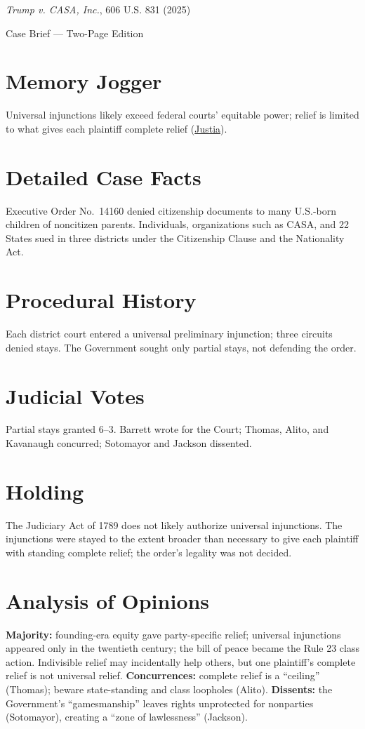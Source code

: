 \documentclass[12pt]{article}
\begin{document}
\begin{center}
{\LARGE \textit{Trump v. CASA, Inc.}, 606 U.S. 831 (2025)\par}
\vspace{0.5em}
{\large Case Brief --- Two-Page Edition\par}
\end{center}

\section{Memory Jogger}
Universal injunctions likely exceed federal courts' equitable power; relief is limited to what gives each plaintiff complete relief (\href{https://supreme.justia.com/cases/federal/us/606/24a884/}{Justia}).

\section{Detailed Case Facts}
Executive Order No.~14160 denied citizenship documents to many U.S.-born children of noncitizen parents. Individuals, organizations such as CASA, and 22 States sued in three districts under the Citizenship Clause and the Nationality Act.

\section{Procedural History}
Each district court entered a universal preliminary injunction; three circuits denied stays. The Government sought only partial stays, not defending the order.

\section{Judicial Votes}
Partial stays granted 6--3. Barrett wrote for the Court; Thomas, Alito, and Kavanaugh concurred; Sotomayor and Jackson dissented.

\section{Holding}
The Judiciary Act of 1789 does not likely authorize universal injunctions. The injunctions were stayed to the extent broader than necessary to give each plaintiff with standing complete relief; the order's legality was not decided.

\section{Analysis of Opinions}
\textbf{Majority:} founding-era equity gave party-specific relief; universal injunctions appeared only in the twentieth century; the bill of peace became the Rule 23 class action. Indivisible relief may incidentally help others, but one plaintiff's complete relief is not universal relief. \textbf{Concurrences:} complete relief is a ``ceiling'' (Thomas); beware state-standing and class loopholes (Alito). \textbf{Dissents:} the Government's ``gamesmanship'' leaves rights unprotected for nonparties (Sotomayor), creating a ``zone of lawlessness'' (Jackson).
\end{document}

